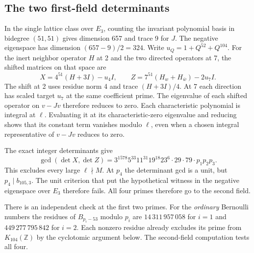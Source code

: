 \documentclass[11pt,a4paper]{article}
\newcommand{\Z}{\mathbb Z}
\begin{document}
\subsection{The two first-field determinants}
In the single lattice class over \(E_3\), counting the invariant polynomial
basis in bidegree \((51,51)\) gives dimension 657 and trace 9 for \(J\).
The negative eigenspace has dimension \((657-9)/2=324\). Write
\(u_Q=1+Q^{52}+Q^{104}\). For the inert neighbor operator \(H\) at 2 and
the two directed operators at 7, the shifted matrices on that space are
\[
 X=4^{51}(H+3I)-u_4 I,\qquad
 Z=7^{51}(H_w+H_{\bar w})-2u_7 I .
\]
The shift at 2 uses residue norm 4 and trace \((H+3I)/4\). At 7 each
direction has scaled target \(u_7\) at the same coefficient prime.
The eigenvalue of each shifted operator on \(v-Jv\) therefore reduces to
zero. Each characteristic polynomial is integral at \(\ell\). Evaluating it
at its characteristic-zero eigenvalue and reducing shows that its constant
term vanishes modulo \(\ell\), even when a chosen integral representative
of \(v-Jv\) reduces to zero.

The exact integer determinants give
\[
 \gcd(\det X,\det Z)=3^{1578}5^{33}11^{31}19^{18}23^6\cdot29\cdot79
                      \cdot p_1p_2p_3 .
\]
This excludes every large \(\ell\nmid M\). At \(p_4\) the determinant gcd is a unit, but \(p_4\mid b_{105,3}\). The unit criterion that put the hypothetical witness in the negative eigenspace over \(E_3\) therefore fails. All four primes therefore go to the second field.

There is an independent check at the first two primes. For the \emph{ordinary}
Bernoulli numbers the residues of \(B_{p_i-53}\) modulo \(p_i\) are
\(14\,311\,957\,058\) for \(i=1\) and \(449\,277\,795\,842\) for \(i=2\).
Each nonzero residue already excludes its prime from \(K_{104}(\Z)\) by the
cyclotomic argument below. The second-field computation tests all four.
\end{document}
